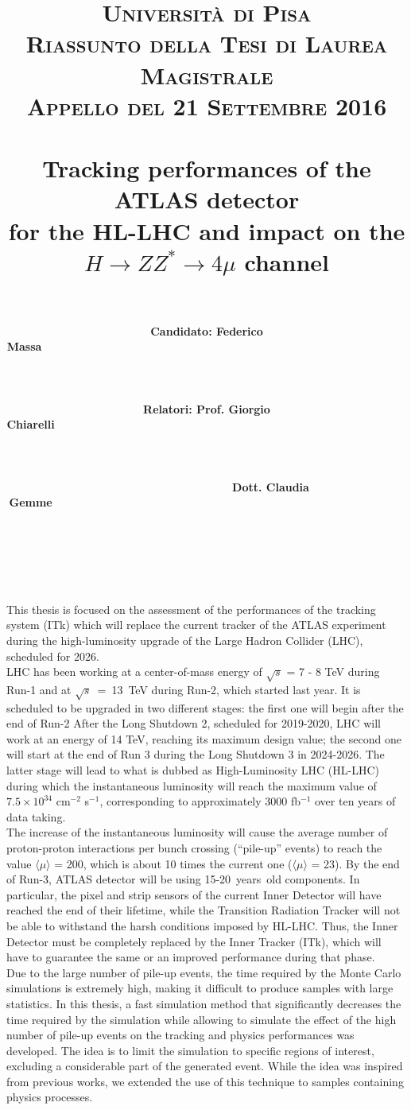 \documentclass[paper=a4, fontsize=11pt]{scrartcl}	%
\title{
		\usefont{OT1}{bch}{b}{n}
		\normalfont \normalsize \textsc{Universit\`a di Pisa} \\[1ex]
		\normalfont \normalsize \textsc{Riassunto della Tesi di Laurea Magistrale}\\ 
		\normalfont \normalsize \textsc{Appello del 21 Settembre 2016}\\ [25pt]
		\horrule{0.5pt} \\[0.4cm]
		\huge  Tracking performances of the ATLAS detector \\
			for the HL-LHC and impact on the \\
			$H\rightarrow ZZ^{*}\rightarrow 4\mu$ channel\\
		\horrule{2pt} \\[0.0cm]
}
\author{
		\normalfont 								\normalsize
        \textbf{Candidato: Federico Massa\ \ \ \ \ \ \ \ \ \ \ \ \ \ \ \ \ \ \ \ \ \ \ \ \ \ \ \ \ \ \ \ \ \ \ \ \ \ \ \ \ \ \ \ \ \ \ \ \ \ \ \ \ \ \ \ \ \ \ \ \ \ \ \ \ \ \ \ \ \ \ \ \ \ \ \ \ \ \ \ \ \ \ \ \ \ \ \ \ \ \ \ \ \ \ \ \ \ \ \ \ \ \ \ \ \ \ \ \ \ \ \ \ \ \ \ \ \ \ \ \ \ \ \ \ \ \ \ \ \ \ \ \ \ \ \ \ \ \ \ \ \ \ \ \ \ \ \ \ \ \ \ \ \ \ \ \ \ \ \ \ \ \ \ \ \ \ \ \ \ \ \ \ \ \ \ \ \ \ \ \ \ \ \ \ \ \ \ \ \ \ \ \ \ \ \ \ \ \ \ \ \ \ \ \ \ \ \ \ \ \ \ \ \ \ \ \ \ \ \ \ \ \ \ } \\[-3pt]		\normalsize
        \textbf{Relatori: Prof. Giorgio Chiarelli\ \ \ \ \ \ \ \ \ \ \ \ \ \ \ \ \ \ \ \ \ \ \ \ \ \ \ \ \ \ \ \ \ \ \ \ \ \ \ \ \ \ \ \ \ \ \ \ \ \ \ \ \ \ \ \ \ \ \ \ \ \ \ \ \ \ \ \ \ \ \ \ \ \ \ \ \ \ \ \ \ \ \ \ \ \ \ \ \ \ \ \ \ \ \ \ \ \ \ \ \ \ \ \ \ \ \ \ \ \ \ \ \ \ \ \ \ \ \ \ \ \ \ \ \ \ \ \ \ \ \ \ \ \ \ \ \ \ \ \ \ \ \ \ \ \ \ \ \ \ \ \ \ \ \ \ \ \ \ \ \ \ \ \ \ \ \ \ \ \ \ \ \ \ \ \ \ \ \ \ \ \ \ \ \ \ \ \ \ \ \ \ \ \ \ \ \ \ \ \ \ \ \ \ \ \ \ \ \ \ \ \ \ \ } \\ [-3pt]\normalsize
        \textbf{\ \ \ \ \ \ \ \ \ \ \ \ \ \ \ \ \ \ \ \ Dott. Claudia Gemme\ \ \ \ \ \ \ \ \ \ \ \ \ \ \ \ \ \ \ \ \ \ \ \ \ \ \ \ \ \ \ \ \ \ \ \ \ \ \ \ \ \ \ \ \ \ \ \ \ \ \ \ \ \ \ \ \ \ \ \ \ \ \ \ \ \ \ \ \ \ \ \ \ \ \ \ \ \ \ \ \ \ \ \ \ \ \ \ \ \ \ \ \ \ \ \ \ \ \ \ \ \ \ \ \ \ \ \ \ \ \ \ \ \ \ \ \ \ \ \ \ \ \ \ \ \ \ \ \ \ \ \ \ \ \ \ \ \ \ \ \ \ \ \ \ \ \ \ \ \ \ \ \ \ \ \ \ \ \ \ \ \ \ \ \ \ \ \ \ \ \ \ \ \ \ \ \ \ \ \ \ \ \ \ \ \ \ \ \ \ \ \ \ \ \ \ \ \ \ \ \ \ \ \ \ \ \ \ \ \ \ \ \ \ }
}
\date{}
\numberwithin{equation}{section}		%
\numberwithin{figure}{section}			%
\numberwithin{table}{section}				%
\begin{document}
\maketitle

This thesis is focused on the assessment of the performances of the tracking system (ITk) which
will replace the current tracker of the ATLAS experiment during the high-luminosity upgrade of
the Large Hadron Collider (LHC), scheduled for 2026. \\

LHC has been working at a center-of-mass
energy of $\sqrt{s}$ = 7 - 8 TeV during Run-1 and at \mbox{$\sqrt{s}$ = 13 TeV} during Run-2, which started last year. It is scheduled to be upgraded in two different stages: the 
first one will begin after the end of Run-2 After the Long Shutdown 2, scheduled for 2019-2020, LHC will work at
an energy of 14 TeV, reaching its maximum design value; the second one will start at
the end of Run 3 during the Long Shutdown 3 in 2024-2026. The latter stage will lead
to what is dubbed as High-Luminosity LHC (HL-LHC) during which the 
instantaneous luminosity will reach the maximum value of $7.5 \times 10^{34}$ cm$^{-2}$ s${^{-1}}$, corresponding to approximately 3000 fb$^{-1}$ over ten years of data taking. \\

The increase of the instantaneous luminosity will cause the average number of proton-proton interactions per bunch crossing (``pile-up'' events) to reach the value $\langle\mu\rangle$ = 200, which 
is about 10 times the current one ($\langle\mu\rangle$ = 23). By the end of Run-3, ATLAS detector will be using \mbox{15-20 years old} components. In particular, the pixel and strip sensors of the current Inner Detector will have reached the end of their lifetime, while the Transition
Radiation Tracker will not be able to withstand the harsh conditions imposed by HL-LHC. Thus,
 the Inner Detector must be completely replaced by the Inner Tracker (ITk), which will have
 to guarantee the same or an improved performance during that phase.\\

Due to the large number of pile-up events, the time required by the Monte Carlo simulations 
is extremely high, making it difficult to produce samples with large statistics. In this thesis,
a fast simulation method that significantly decreases the time required by the simulation while
allowing to simulate the effect of the high number of pile-up events on the tracking
and physics performances was developed. The idea is to limit the simulation to specific regions of interest, excluding a considerable part of the generated event. While the idea was inspired
from previous works, we extended the use of this technique to samples containing physics 
processes.\\
\end{document}
